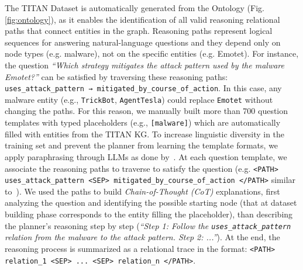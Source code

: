 \documentclass[11pt]{article}
\begin{document}
The TITAN Dataset is automatically generated from the Ontology (Fig. \ref{fig:ontology}), as it enables the identification of all valid reasoning relational paths that connect entities in the graph. Reasoning paths represent logical sequences for answering natural-language questions and they depend only on node types (e.g. malware), not on the specific entities (e.g. Emotet). For instance, the question \textit{“Which strategy mitigates the attack pattern used by the malware Emotet?”} can be satisfied by traversing these reasoning paths:
\texttt{uses\_attack\_pattern → mitigated\_by\_course\_of\_action}. In this case, any malware entity (e.g., \texttt{TrickBot}, \texttt{AgentTesla}) could replace \texttt{Emotet} without changing the paths. For this reason, we manually built more than 700 question templates with typed placeholders (e.g., \texttt{[malware]}) which are automatically filled with entities from the TITAN KG. To increase linguistic diversity in the training set and prevent the planner from learning the template formats, we apply paraphrasing through LLMs as done by~\cite{alajramy2025device}.
At each question template, we associate the reasoning paths to traverse to satisfy the question (e.g. \texttt{<PATH> uses\_attack\_pattern <SEP> mitigated\_by\_course\_of\_action </PATH>} similar to~\cite{rog}). We used the paths to build \textit{Chain-of-Thought (CoT)} explanations, first analyzing the question and identifying the possible starting node (that at dataset building phase corresponds to the entity filling the placeholder), than describing
the planner’s reasoning step by step (\textit{“Step 1: Follow the \texttt{uses\_attack\_pattern} relation from the malware to the attack pattern. Step 2: ...”}). 
At the end, the reasoning process is summarized as a relational trace in the format: \texttt{<PATH> relation\_1 <SEP> ... <SEP> relation\_n </PATH>}. 
\end{document}
